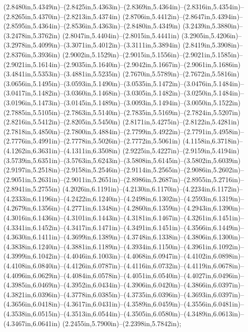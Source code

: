 (2.8480in,5.4349in)--(2.8425in,5.4363in)--(2.8369in,5.4364in)--(2.8316in,5.4354in)--(2.8265in,5.4370in)--(2.8213in,5.4374in) (2.8706in,5.4412in)--(2.8647in,5.4394in)--(2.8595in,5.4364in)--(2.8536in,5.4363in)--(2.8480in,5.4349in) (3.2439in,5.3880in)--(3.2478in,5.3762in) (2.8047in,5.4404in)--(2.8015in,5.4441in) (3.2905in,5.4206in)--(3.2978in,5.4099in)--(3.3071in,5.4012in)--(3.3111in,5.3894in) (2.8419in,5.3908in)--(2.8376in,5.3936in) (2.9002in,5.1529in)--(2.9015in,5.1556in)--(2.9021in,5.1585in)--(2.9021in,5.1614in)--(2.9035in,5.1640in)--(2.9042in,5.1667in)--(2.9061in,5.1686in) (3.4841in,5.5353in)--(3.4881in,5.5235in) (2.7670in,5.5789in)--(2.7672in,5.5816in) (3.0656in,5.1495in)--(3.0593in,5.1490in)--(3.0535in,5.1472in)--(3.0476in,5.1484in)--(3.0417in,5.1482in)--(3.0360in,5.1468in)--(3.0305in,5.1482in)--(3.0250in,5.1484in)--(3.0196in,5.1473in)--(3.0145in,5.1489in)--(3.0093in,5.1494in)--(3.0050in,5.1522in) (2.7885in,5.5105in)--(2.7863in,5.5140in)--(2.7835in,5.5169in)--(2.7824in,5.5207in) (2.8216in,5.5412in)--(2.8205in,5.5450in) (2.8171in,5.4275in)--(2.8122in,5.4281in) (2.7818in,5.4850in)--(2.7800in,5.4884in)--(2.7799in,5.4922in)--(2.7791in,5.4958in)--(2.7776in,5.4991in)--(2.7778in,5.5026in)--(2.7772in,5.5061in) (4.1158in,6.3718in)--(4.1262in,6.3631in)--(4.1311in,6.3508in) (2.9225in,5.4227in)--(2.9159in,5.4194in) (3.5739in,5.6351in)--(3.5763in,5.6243in)--(3.5808in,5.6145in)--(3.5802in,5.6039in) (2.9197in,5.2518in)--(2.9158in,5.2546in)--(2.9114in,5.2565in)--(2.9086in,5.2602in)--(2.9051in,5.2631in)--(2.9011in,5.2651in)--(2.8986in,5.2687in)--(2.8955in,5.2716in)--(2.8941in,5.2755in) (4.2026in,6.1191in)--(4.2130in,6.1170in)--(4.2234in,6.1172in)--(4.2333in,6.1196in)--(4.2422in,6.1240in)--(4.2498in,6.1302in)--(4.2593in,6.1319in)--(4.2679in,6.1356in)--(4.2771in,6.1348in)--(4.2860in,6.1359in)--(4.2943in,6.1390in)--(4.3016in,6.1436in)--(4.3101in,6.1443in)--(4.3181in,6.1467in)--(4.3261in,6.1451in)--(4.3341in,6.1452in)--(4.3417in,6.1471in)--(4.3491in,6.1451in)--(4.3566in,6.1449in)--(4.3630in,6.1411in)--(4.3699in,6.1389in)--(4.3748in,6.1338in)--(4.3806in,6.1300in)--(4.3838in,6.1240in)--(4.3881in,6.1189in)--(4.3934in,6.1150in)--(4.3961in,6.1092in)--(4.3999in,6.1042in)--(4.4046in,6.1003in)--(4.4068in,6.0947in)--(4.4102in,6.0898in)--(4.4108in,6.0840in)--(4.4126in,6.0787in)--(4.4116in,6.0732in)--(4.4119in,6.0678in)--(4.4096in,6.0629in)--(4.4084in,6.0578in)--(4.4051in,6.0540in)--(4.4027in,6.0496in)--(4.3985in,6.0469in)--(4.3952in,6.0434in)--(4.3906in,6.0420in)--(4.3866in,6.0397in)--(4.3821in,6.0396in)--(4.3778in,6.0385in)--(4.3735in,6.0396in)--(4.3693in,6.0397in)--(4.3656in,6.0418in)--(4.3617in,6.0431in)--(4.3589in,6.0459in)--(4.3556in,6.0481in)--(4.3538in,6.0515in)--(4.3513in,6.0544in)--(4.3505in,6.0580in)--(4.3489in,6.0613in)--(4.3467in,6.0641in) (2.2455in,5.7900in)--(2.2398in,5.7842in);
